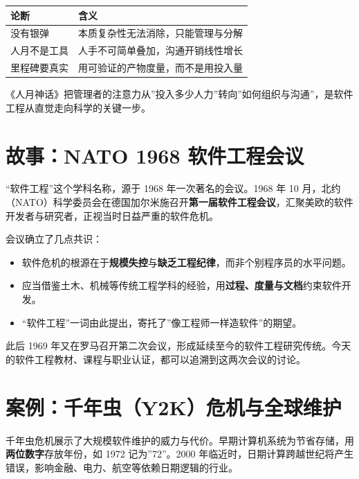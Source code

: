\documentclass[12pt,a4paper,twoside,openany]{ctexbook}
\numberwithin{figure}{chapter}
\numberwithin{table}{chapter}
\providecommand{\tightlist}{\setlength{\itemsep}{0pt}\setlength{\parskip}{0pt}}
\newcounter{none}
\begin{document}
{\def\LTcaptype{none} %
\begin{longtable}[]{@{}ll@{}}
\toprule\noalign{}
论断 & 含义 \\
\midrule\noalign{}
\endhead
\bottomrule\noalign{}
\endlastfoot
没有银弹 & 本质复杂性无法消除，只能管理与分解 \\
人月不是工具 & 人手不可简单叠加，沟通开销线性增长 \\
里程碑要真实 & 用可验证的产物度量，而不是用投入量 \\
\end{longtable}
}

《人月神话》把管理者的注意力从''投入多少人力''转向''如何组织与沟通''，是软件工程从直觉走向科学的关键一步。

\section{故事：NATO 1968
软件工程会议}\label{ux6545ux4e8bnato-1968-ux8f6fux4ef6ux5de5ux7a0bux4f1aux8bae}

``软件工程''这个学科名称，源于 1968 年一次著名的会议。1968 年 10
月，北约（NATO）科学委员会在德国加尔米施召开\textbf{第一届软件工程会议}，汇聚美欧的软件开发者与研究者，正视当时日益严重的软件危机。

会议确立了几点共识：

\begin{itemize}
\tightlist
\item
  软件危机的根源在于\textbf{规模失控}与\textbf{缺乏工程纪律}，而非个别程序员的水平问题。
\item
  应当借鉴土木、机械等传统工程学科的经验，用\textbf{过程、度量与文档}约束软件开发。
\item
  ``软件工程''一词由此提出，寄托了''像工程师一样造软件''的期望。
\end{itemize}

此后 1969
年又在罗马召开第二次会议，形成延续至今的软件工程研究传统。今天的软件工程教材、课程与职业认证，都可以追溯到这两次会议的讨论。

\section{案例：千年虫（Y2K）危机与全球维护}\label{ux6848ux4f8bux5343ux5e74ux866by2kux5371ux673aux4e0eux5168ux7403ux7ef4ux62a4}

千年虫危机展示了大规模软件维护的威力与代价。早期计算机系统为节省存储，用\textbf{两位数字}存放年份，如
1972 记为''72''。2000
年临近时，日期计算跨越世纪将产生错误，影响金融、电力、航空等依赖日期逻辑的行业。
\end{document}
